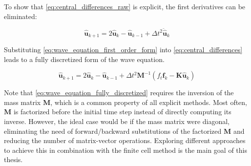 To show that \ref{eq:central_differences_raw} is explicit, the first derivatives can be eliminated:

\begin{equation} \label{eq:central_differences}
	\hat{\mathbf u}_{k+1} = 2\hat{\mathbf u}_k - \hat{\mathbf u}_{k-1} + \Delta t^2 \ddot{\hat{\mathbf u}}_k
\end{equation}

Substituting \ref{eq:wave_equation_first_order_form} into \ref{eq:central_differences} leads to a fully discretized form of the wave equation.

\begin{equation} \label{eq:wave_equation_fully_discretized}
	\hat{\mathbf u}_{k+1} = 2\hat{\mathbf u}_k - \hat{\mathbf u}_{k-1} + \Delta t^2 \mathbf M^{-1}(f_t \mathbf f_k - \mathbf K \hat{\mathbf u}_k)
\end{equation}

Note that \ref{eq:wave_equation_fully_discretized} requires the inversion of the mass matrix $\mathbf M$, which is a common property of all explicit methods. Most often, $\mathbf M$ is factorized before the initial time step instead of directly computing its inverse. However, the ideal case would be if the mass matrix were diagonal, eliminating the need of forward/backward substitutions of the factorized $\mathbf M$ and reducing the number of matrix-vector operations. Exploring different approaches to achieve this in combination with the finite cell method is the main goal of this thesis.